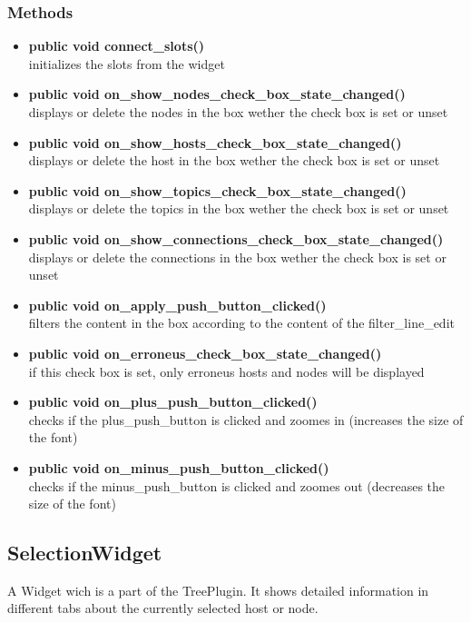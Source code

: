 \subsubsection{Methods}
\begin{itemize}
  \item \textbf{public void connect\_slots()}\\
  initializes the slots from the widget
  \item \textbf{public void on\_show\_nodes\_check\_box\_state\_changed()}\\
  displays or delete the nodes in the box wether the check box is set or unset
  \item \textbf{public void on\_show\_hosts\_check\_box\_state\_changed()}\\
  displays or delete the host in the box wether the check box is set or unset
  \item \textbf{public void on\_show\_topics\_check\_box\_state\_changed()}\\
  displays or delete the topics in the box wether the check box is set or unset
  \item \textbf{public void
  on\_show\_connections\_check\_box\_state\_changed()}\\
  displays or delete the connections in the box wether the check box is set or
  unset
  \item \textbf{public void on\_apply\_push\_button\_clicked()}\\
  filters the content in the box according to the content of the
  filter\_line\_edit
  \item \textbf{public void on\_erroneus\_check\_box\_state\_changed()}\\
  if this check box is set, only erroneus hosts and nodes will be displayed  
  \item \textbf{public void on\_plus\_push\_button\_clicked()}\\
  checks if the plus\_push\_button is clicked and zoomes in (increases the size
  of the font)
  \item \textbf{public void on\_minus\_push\_button\_clicked()}\\
  checks if the minus\_push\_button is clicked and zoomes out (decreases the
  size of the font)
\end{itemize}

\subsection{SelectionWidget}
A Widget wich is a part of the TreePlugin. It shows detailed information
in different tabs about the currently selected host or node.
